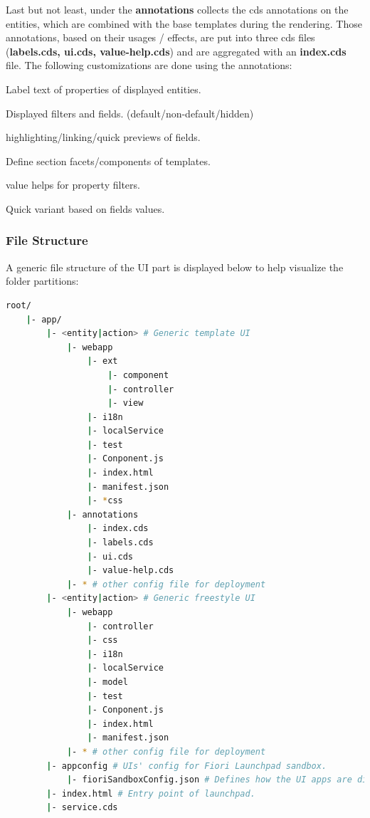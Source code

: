 \bigskip
Last but not least, under the \textbf{annotations} collects the cds annotations on the entities, which are combined with the base templates during the rendering.
Those annotations, based on their usages / effects, are put into three cds files (\textbf{labels.cds, ui.cds, value-help.cds}) and are aggregated with an \textbf{index.cds} file.
The following customizations are done using the annotations:

\begin{compactenum}
    \item Label text of properties of displayed entities.
    \item Displayed filters and fields. (default/non-default/hidden)
    \item highlighting/linking/quick previews of fields.
    \item Define section facets/components of templates.
    \item value helps for property filters.
    \item Quick variant based on fields values.
\end{compactenum}

\subsubsection{File Structure}

A generic file structure of the UI part is displayed below to help visualize the folder partitions: 

\begin{lstlisting}[language={bash}]
root/
    |- app/
        |- <entity|action> # Generic template UI
            |- webapp
                |- ext
                    |- component 
                    |- controller
                    |- view
                |- i18n
                |- localService
                |- test
                |- Conponent.js
                |- index.html
                |- manifest.json
                |- *css 
            |- annotations
                |- index.cds
                |- labels.cds
                |- ui.cds
                |- value-help.cds
            |- * # other config file for deployment
        |- <entity|action> # Generic freestyle UI
            |- webapp
                |- controller
                |- css
                |- i18n
                |- localService
                |- model
                |- test
                |- Conponent.js
                |- index.html
                |- manifest.json
            |- * # other config file for deployment
        |- appconfig # UIs' config for Fiori Launchpad sandbox.
            |- fioriSandboxConfig.json # Defines how the UI apps are dispalyed and navigated.
        |- index.html # Entry point of launchpad.
        |- service.cds
\end{lstlisting}

